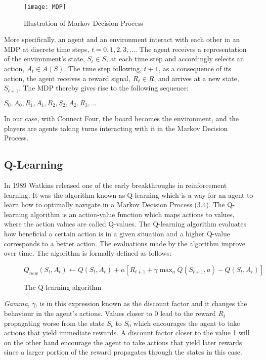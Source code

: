 \documentclass[titlepage]{article}
\begin{document}
\begin{figure}[h]
    \centering
    \texttt{[image: MDP]}
    \caption{Illustration of Markov Decision Process}
\end{figure}

\noindent
More specifically, an agent and an environment interact with each other in an MDP at discrete time steps, $t = 0, 1, 2, 3, ...$. The agent receives a representation of the environment's state, $S_{t} \in S$, at each time step and accordingly selects an action, $A_{t} \in A(S)$. The time step following, $t + 1$, as a consequence of its action, the agent receives a reward signal, $R_{t} \in R$, and arrives at a new state, $S_{t+1}$. The MDP thereby gives rise to the following sequence: 

\vskip 0.3cm

\centerline{$S_{0}, A_{0}, R_{1}, A_{1}, R_{2}, S_{2}, A_{2}, R_{3}, ...$}

\vskip 0.3cm

\noindent
In our case, with Connect Four, the board becomes the environment, and the players are agents taking turns interacting with it in the Markov Decision Process.

\subsection{Q-Learning}

\vskip 0.2cm
In 1989 Watkins \cite{sutton} released one of the early breakthroughs in reinforcement learning. It was the algorithm known as Q-learning which is a way for an agent to learn how to optimally navigate in a Markov Decision Process (3.4). The Q-learning algorithm is an action-value function which maps actions to values, where the action values are called Q-values. The Q-learning algorithm evaluates how beneficial a certain action is in a given situation and a higher Q-value corresponds to a better action. The evaluations made by the algorithm improve over time. The algorithm \cite{sutton} is formally defined as follows:

\newpage

\begin{figure}[h]
    \centerline{$Q_{new}(S_{t}, A_{t}) \leftarrow Q(S_{t}, A_{t}) + \alpha[R_{t+1} + \gamma\max_{a}Q(S_{t+1}, a) - Q(S_{t}, A_{t})]$}
    \vskip 0.2cm
    \caption{The Q-learning algorithm}
\end{figure}

\vskip 0.3cm

\noindent
\emph{Gamma}, $\gamma$, is in this expression known as the discount factor and it changes the behaviour in the agent's actions. Values closer to 0 lead to the reward $R_{t}$ propagating worse from the state $S_{t}$ to $S_{0}$ which encourages the agent to take actions that yield immediate rewards. A discount factor closer to the value 1 will on the other hand encourage the agent to take actions that yield later rewards since a larger portion of the reward propagates through the states in this case. 
\end{document}
